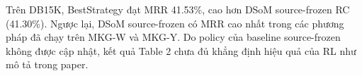 Trên DB15K, BestStrategy đạt MRR 41.53\%, cao hơn
DSoM source-frozen RC (41.30\%). Ngược lại, DSoM
source-frozen có MRR cao nhất trong các phương pháp
đã chạy trên MKG-W và MKG-Y. Do policy của baseline
source-frozen không được cập nhật, kết quả Table 2
chưa đủ khẳng định hiệu quả của RL như mô tả trong paper.




\endgroup


